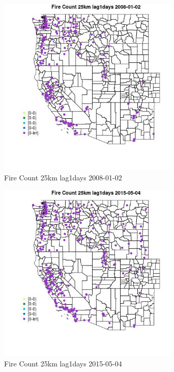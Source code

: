 \begin{figure} 
\centering  
\includegraphics[width=0.77\textwidth]{Code_Outputs/Report_ML_input_PM25_Step4_part_e_de_duplicated_aves_compiled_2019-05-18wNAs_MapObsFire_Count_25km_lag1days2008-01-02.jpg} 
\caption{\label{fig:Report_ML_input_PM25_Step4_part_e_de_duplicated_aves_compiled_2019-05-18wNAsMapObsFire_Count_25km_lag1days2008-01-02}Fire Count 25km lag1days 2008-01-02} 
\end{figure} 
 

\begin{figure} 
\centering  
\includegraphics[width=0.77\textwidth]{Code_Outputs/Report_ML_input_PM25_Step4_part_e_de_duplicated_aves_compiled_2019-05-18wNAs_MapObsFire_Count_25km_lag1days2015-05-04.jpg} 
\caption{\label{fig:Report_ML_input_PM25_Step4_part_e_de_duplicated_aves_compiled_2019-05-18wNAsMapObsFire_Count_25km_lag1days2015-05-04}Fire Count 25km lag1days 2015-05-04} 
\end{figure} 
 

